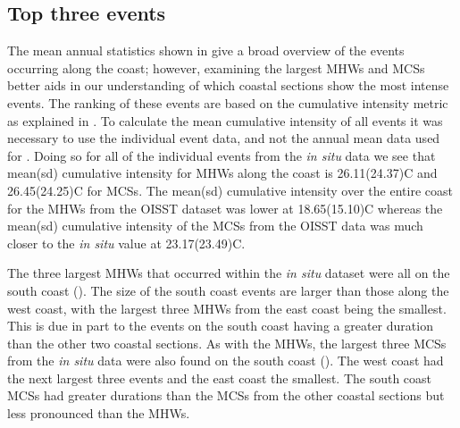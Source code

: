 \documentclass[a4paper,10pt,review]{elsarticle}
\begin{document}
\subsection{Top three events}
The mean annual statistics shown in  give a broad overview of the events occurring along the coast; however, examining the largest MHWs and MCSs better aids in our understanding of which coastal sections show the most intense events. The ranking of these events are based on the cumulative intensity metric as explained in . To calculate the mean cumulative intensity of all events it was necessary to use the individual event data, and not the annual mean data used for . Doing so for all of the individual events from the \emph{in situ} data we see that mean(sd) cumulative intensity for MHWs along the coast is 26.11(24.37)\degree C and 26.45(24.25)\degree C for MCSs. The mean(sd) cumulative intensity over the entire coast for the MHWs from the OISST dataset was lower at 18.65(15.10)\degree C whereas the mean(sd) cumulative intensity of the MCSs from the OISST data was much closer to the \emph{in situ} value at 23.17(23.49)\degree C.

The three largest MHWs that occurred within the \emph{in situ} dataset were all on the south coast (). The size of the south coast events are larger than those along the west coast, with the largest three MHWs from the east coast being the smallest. This is due in part to the events on the south coast having a greater duration than the other two coastal sections. As with the MHWs, the largest three MCSs from the \emph{in situ} data were also found on the south coast (). The west coast had the next largest three events and the east coast the smallest. The south coast MCSs had greater durations than the MCSs from the other coastal sections but less pronounced than the MHWs.
\end{document}
